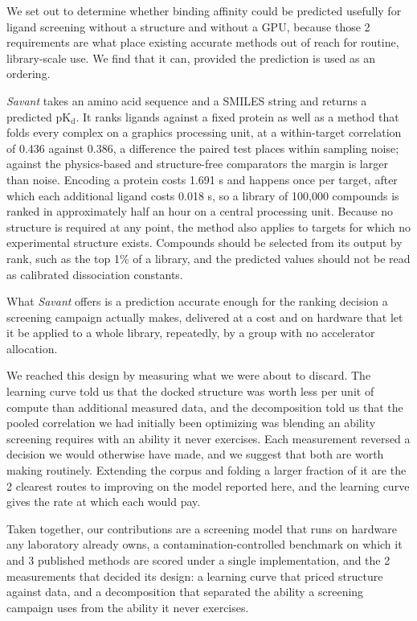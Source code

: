 \documentclass[times, twoside]{zHenriquesLab-StyleBioRxiv}
\newcommand{\savant}{\textit{Savant}\xspace}
\newcommand{\pkd}{\ensuremath{\mathrm{pK_d}}\xspace}
\begin{document}
We set out to determine whether binding affinity could be predicted usefully for ligand screening without a structure and without a GPU, because those 2 requirements are what place existing accurate methods out of reach for routine, library-scale use. We find that it can, provided the prediction is used as an ordering.

\savant takes an amino acid sequence and a SMILES string and returns a predicted \pkd. It ranks ligands against a fixed protein as well as a method that folds every complex on a graphics processing unit, at a within-target correlation of 0.436 against 0.386, a difference the paired test places within sampling noise; against the physics-based and structure-free comparators the margin is larger than noise. Encoding a protein costs 1.691 s and happens once per target, after which each additional ligand costs 0.018 s, so a library of 100,000 compounds is ranked in approximately half an hour on a central processing unit. Because no structure is required at any point, the method also applies to targets for which no experimental structure exists. Compounds should be selected from its output by rank, such as the top 1\% of a library, and the predicted values should not be read as calibrated dissociation constants.

What \savant offers is a prediction accurate enough for the ranking decision a screening campaign actually makes, delivered at a cost and on hardware that let it be applied to a whole library, repeatedly, by a group with no accelerator allocation.

We reached this design by measuring what we were about to discard. The learning curve told us that the docked structure was worth less per unit of compute than additional measured data, and the decomposition told us that the pooled correlation we had initially been optimizing was blending an ability screening requires with an ability it never exercises. Each measurement reversed a decision we would otherwise have made, and we suggest that both are worth making routinely. Extending the corpus and folding a larger fraction of it are the 2 clearest routes to improving on the model reported here, and the learning curve gives the rate at which each would pay.

Taken together, our contributions are a screening model that runs on hardware any laboratory already owns, a contamination-controlled benchmark on which it and 3 published methods are scored under a single implementation, and the 2 measurements that decided its design: a learning curve that priced structure against data, and a decomposition that separated the ability a screening campaign uses from the ability it never exercises.
\end{document}
